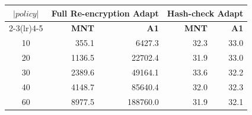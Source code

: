 \begin{tabular}{c rr rr}
\toprule
\multirow{2}{*}{$|policy|$} & \multicolumn{2}{c}{\textbf{Full Re-encryption Adapt}} & \multicolumn{2}{c}{\textbf{Hash-check Adapt}} \\
\cmidrule(lr){2-3}\cmidrule(lr){4-5}
 & \textbf{MNT} & \textbf{A1} & \textbf{MNT} & \textbf{A1} \\
\midrule
10 & 355.1 & 6427.3 & 32.3 & 33.0 \\
20 & 1136.5 & 22702.4 & 31.9 & 33.0 \\
30 & 2389.6 & 49164.1 & 33.6 & 32.2 \\
40 & 4148.7 & 85640.4 & 32.0 & 32.3 \\
60 & 8977.5 & 188760.0 & 31.9 & 32.1 \\
\bottomrule
\end{tabular}
